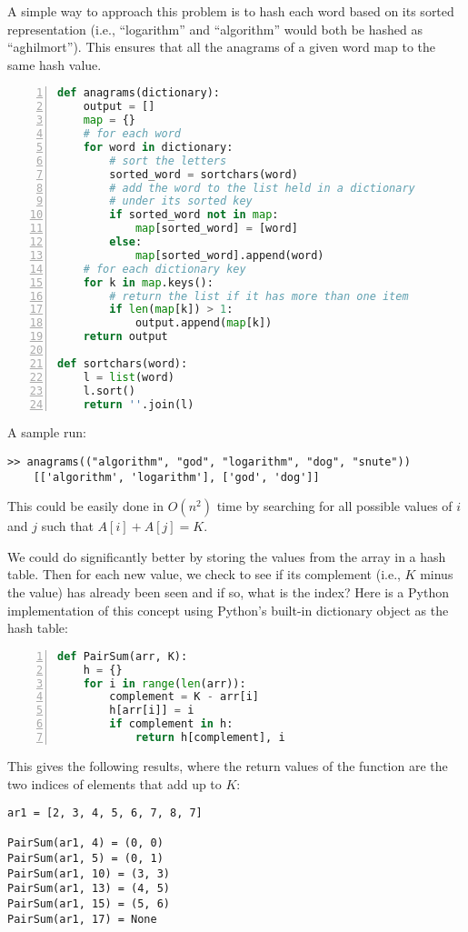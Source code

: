 A simple way to approach this problem is to hash each word based on its sorted 
representation (i.e., ``logarithm'' and ``algorithm'' would both be hashed as ``aghilmort'').
This ensures that all the anagrams of a given word map to the same hash value.

\begin{lstlisting}[basicstyle=\footnotesize,numbers=left,breaklines=true,language=Python]
def anagrams(dictionary):
    output = []
    map = {}
    # for each word
    for word in dictionary:
        # sort the letters
        sorted_word = sortchars(word)
        # add the word to the list held in a dictionary 
        # under its sorted key
        if sorted_word not in map:
            map[sorted_word] = [word]
        else:
            map[sorted_word].append(word)
    # for each dictionary key
    for k in map.keys():
        # return the list if it has more than one item
        if len(map[k]) > 1:
            output.append(map[k])
    return output
 
def sortchars(word):
    l = list(word)
    l.sort()
    return ''.join(l)
\end{lstlisting} 

A sample run:
{\footnotesize
\begin{verbatim} 
>> anagrams(("algorithm", "god", "logarithm", "dog", "snute"))
    [['algorithm', 'logarithm'], ['god', 'dog']]
\end{verbatim} 
}

This could be easily done in $O(n^2)$ time by searching for all possible values of $i$ and $j$ such that $A[i] + A[j] = K$.

We could do significantly better by storing the values from the array in 
a hash table. Then for each new value, we check to see if its 
complement (i.e., $K$ minus the value) has already 
been seen and if so, what is the index?
Here is a Python implementation of this 
concept using Python's built-in dictionary object as the hash table:

\begin{lstlisting}[basicstyle=\footnotesize,numbers=left,breaklines=true,language=Python]
def PairSum(arr, K):
    h = {}
    for i in range(len(arr)):
        complement = K - arr[i]
        h[arr[i]] = i
        if complement in h:
            return h[complement], i
\end{lstlisting} 

This gives the following results, where the return values of the function are the two 
indices of elements that add up to $K$:
{\footnotesize
\begin{verbatim} 
ar1 = [2, 3, 4, 5, 6, 7, 8, 7]

PairSum(ar1, 4) = (0, 0)
PairSum(ar1, 5) = (0, 1)
PairSum(ar1, 10) = (3, 3)
PairSum(ar1, 13) = (4, 5)
PairSum(ar1, 15) = (5, 6)
PairSum(ar1, 17) = None
\end{verbatim} 
}

